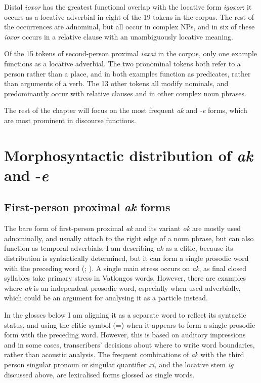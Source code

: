 \documentclass[output=paper,colorlinks,citecolor=brown]{langscibook}
\begin{document}
Distal \textit{ioxor} has the greatest functional overlap with the locative form \textit{igoxor}: it occurs as a locative adverbial in eight of the 19 tokens in the corpus. The rest of the occurrences are adnominal, but all occur in complex NPs, and in six of these \textit{ioxor} occurs in a relative clause with an unambiguously locative meaning.

Of the 15 tokens of second-person proximal \textit{iaxai} in the corpus, only one example functions as a locative adverbial. The two pronominal tokens both refer to a person rather than a place, and in both examples function as predicates, rather than arguments of a verb. The 13 other tokens all modify nominals, and predominantly occur with relative clauses and in other complex noun phrases.

The rest of the chapter will focus on the most frequent \textit{ak} and \textit{-e} forms, which are most prominent in discourse functions.

\section{Morphosyntactic distribution of \textit{ak} and -\textit{e}}
\label{sec:ridge:3}

\subsection{First-person proximal \textit{ak} forms}
\label{sec:ridge:3.1}

The bare form of first-person proximal \textit{ak} and its variant \textit{ok} are mostly used adnominally, and usually attach to the right edge of a noun phrase, but can also function as temporal adverbials. I am describing \textit{ak} as a clitic, because its distribution is syntactically determined, but it can form a single prosodic word with the preceding word (\citealt{ZwickyPullum1983}; \citealt{SpencerLuís2012}). A single main stress occurs on \textit{ak}, as final closed syllables take primary stress in Vatlongos words. However, there are examples where \textit{ak} is an independent prosodic word, especially when used adverbially, which could be an argument for analysing it as a particle instead.

In the glosses below I am aligning it as a separate word to reflect its syntactic status, and using the clitic symbol (=) when it appears to form a single prosodic form with the preceding word. However, this is based on auditory impressions and in some cases, transcribers’ decisions about where to write word boundaries, rather than acoustic analysis. The frequent combinations of \textit{ak} with the third person singular pronoun or singular quantifier \textit{xi,} and the locative stem \textit{ig} discussed above, are lexicalised forms glossed as single words.
\end{document}
